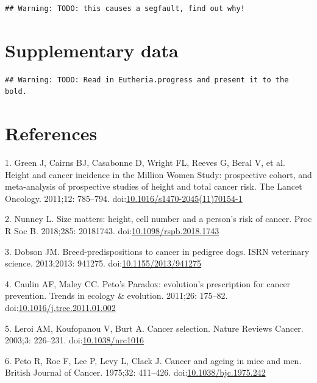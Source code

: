 \documentclass[10pt,letterpaper]{article}
\begin{document}
\begin{verbatim}
## Warning: TODO: this causes a segfault, find out why!
\end{verbatim}

\hypertarget{supplementary-data}{%
\section{Supplementary data}\label{supplementary-data}}

\begin{verbatim}
## Warning: TODO: Read in Eutheria.progress and present it to the bold.
\end{verbatim}

\hypertarget{references}{%
\section*{References}\label{references}}

\hypertarget{refs}{}
\leavevmode\hypertarget{ref-Green2011}{}%
1. Green J, Cairns BJ, Casabonne D, Wright FL, Reeves G, Beral V, et al.
Height and cancer incidence in the Million Women Study: prospective
cohort, and meta-analysis of prospective studies of height and total
cancer risk. The Lancet Oncology. 2011;12: 785--794.
doi:\href{https://doi.org/10.1016/s1470-2045(11)70154-1}{10.1016/s1470-2045(11)70154-1}

\leavevmode\hypertarget{ref-Nunney:20181c2}{}%
2. Nunney L. Size matters: height, cell number and a person's risk of
cancer. Proc R Soc B. 2018;285: 20181743.
doi:\href{https://doi.org/10.1098/rspb.2018.1743}{10.1098/rspb.2018.1743}

\leavevmode\hypertarget{ref-Dobson2013}{}%
3. Dobson JM. Breed-predispositions to cancer in pedigree dogs. ISRN
veterinary science. 2013;2013: 941275.
doi:\href{https://doi.org/10.1155/2013/941275}{10.1155/2013/941275}

\leavevmode\hypertarget{ref-CaulinAndMaley2011}{}%
4. Caulin AF, Maley CC. Peto's Paradox: evolution's prescription for
cancer prevention. Trends in ecology \& evolution. 2011;26: 175--82.
doi:\href{https://doi.org/10.1016/j.tree.2011.01.002}{10.1016/j.tree.2011.01.002}

\leavevmode\hypertarget{ref-Leroi2003}{}%
5. Leroi AM, Koufopanou V, Burt A. Cancer selection. Nature Reviews
Cancer. 2003;3: 226--231.
doi:\href{https://doi.org/10.1038/nrc1016}{10.1038/nrc1016}

\leavevmode\hypertarget{ref-Peto1975}{}%
6. Peto R, Roe F, Lee P, Levy L, Clack J. Cancer and ageing in mice and
men. British Journal of Cancer. 1975;32: 411--426.
doi:\href{https://doi.org/10.1038/bjc.1975.242}{10.1038/bjc.1975.242}
\end{document}
